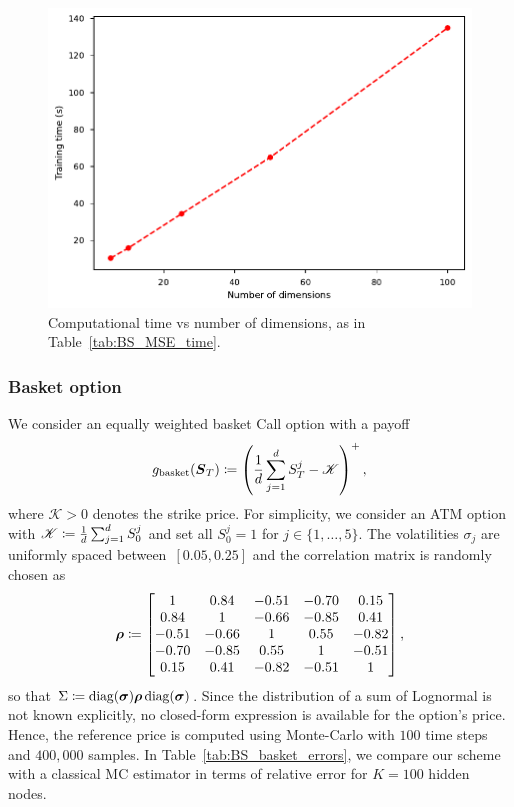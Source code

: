\begin{figure}[hbt!]
    \centering
    \includegraphics[scale=0.6]{content/reschap2/Figures/BS_time_dimensions.pdf}
    \caption{Computational time vs number of dimensions, as in Table~\ref{tab:BS_MSE_time}.}
    \label{fig:BS_time}
\end{figure}

\subsubsection{Basket option}\label{sec:results_basket_BS}
We consider an equally weighted basket Call option with a payoff
\[
g_{\textup{basket}}(\boldsymbol{S}_T)\coloneqq \left(\frac1d\sum_{j=1}^d S^j_T - \mathscr K\right)^+,
\]
where $\mathscr K>0$ denotes the strike price. For simplicity, we consider an ATM option with $\mathscr K\coloneqq \frac1d\sum_{j=1}^d S^j_0$ and set all $S_0^j=1$ for $j\in\{1,\dots,5\}$. The volatilities $\sigma_j$ are uniformly spaced between~$[0.05, 0.25]$ and the correlation matrix is randomly chosen as
 \[
 \boldsymbol \rho \coloneqq
\begin{bmatrix}
    1  & 0.84  & -0.51 & -0.70 & 0.15  \\
0.84  & 1  & -0.66 & -0.85 & 0.41  \\
-0.51 & -0.66 & 1  & 0.55  & -0.82 \\
-0.70 & -0.85 & 0.55  & 1  & -0.51 \\
0.15  & 0.41  & -0.82 & -0.51 & 1
\end{bmatrix},
 \]
so that $\Sigma\coloneqq \operatorname{diag}(\boldsymbol \sigma)\boldsymbol \rho \operatorname{diag}(\boldsymbol \sigma)$. Since the distribution of a sum of Lognormal is not known explicitly, no closed-form expression is available for the option's price. Hence, the reference price is computed using Monte-Carlo with $100$ time steps and $400,000$ samples. In Table~\ref{tab:BS_basket_errors}, we compare our scheme with a classical MC estimator in terms of relative error for $K = 100$ hidden nodes. 

